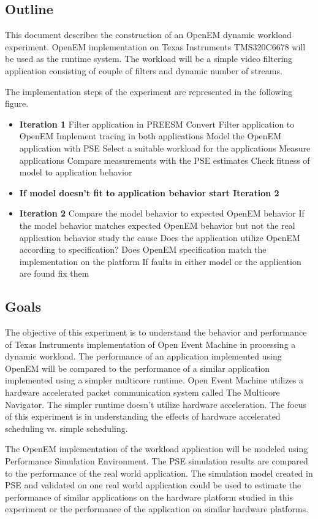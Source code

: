 \subsection{Outline}
This document describes the construction of an OpenEM dynamic workload experiment. OpenEM implementation on Texas Instruments TMS320C6678 will be used as the runtime system. The workload will be a simple video filtering application consisting of couple of filters and dynamic number of streams.

The implementation steps of the experiment are represented in the following figure.

\begin{itemize}
\item[] \textbf{Iteration 1}
    \subitem Filter application in PREESM
    \subitem Convert Filter application to OpenEM
    \subitem Implement tracing in both applications
    \subitem Model the OpenEM application with PSE
    \subitem Select a suitable workload for the applications
    \subitem Measure applications
    \subitem Compare measurements with the PSE estimates
    \subitem Check fitness of model to application behavior
\item[] \textbf{If model doesn't fit to application behavior start Iteration 2}
\item[] \textbf{Iteration 2}
    \subitem Compare the model behavior to expected OpenEM behavior
    \subitem If the model behavior matches expected OpenEM behavior but not the real application behavior study the cause
    \subitem Does the application utilize OpenEM according to specification?
    \subitem Does OpenEM specification match the implementation on the platform
    \subitem If faults in either model or the application are found fix them
\end{itemize}

\subsection{Goals}
The objective of this experiment is to understand the behavior and performance of Texas Instruments implementation of Open Event Machine in processing a dynamic workload. The performance of an application implemented using OpenEM will be compared to the performance of a similar application implemented using a simpler multicore runtime. Open Event Machine utilizes a hardware accelerated packet communication system called The Multicore Navigator. The simpler runtime doesn't utilize hardware acceleration. The focus of this experiment is in understanding the effects of hardware accelerated scheduling vs. simple scheduling.

The OpenEM implementation of the workload application will be modeled using Performance Simulation Environment. The PSE simulation results are compared to the performance of the real world application. The simulation model created in PSE and validated on one real world application could be used to estimate the performance of similar applications on the hardware platform studied in this experiment or the performance of the application on similar hardware platforms.